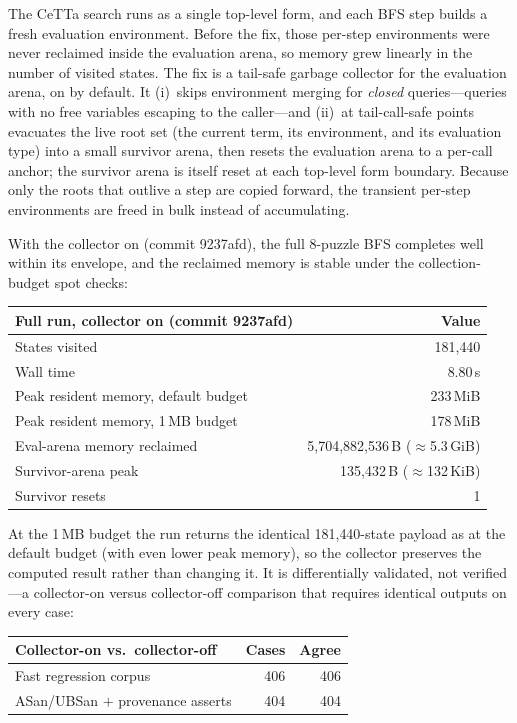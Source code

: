 \documentclass[11pt]{article}
\newcommand{\CeTTa}{\textup{CeTTa}}
\begin{document}
The \CeTTa{} search runs as a single top-level form, and each BFS step
builds a fresh evaluation environment.  Before the fix, those per-step
environments were never reclaimed inside the evaluation arena, so memory
grew linearly in the number of visited states.  The fix is a tail-safe
garbage collector for the evaluation arena, on by default.  It
(i)~skips environment merging for \emph{closed} queries---queries with
no free variables escaping to the caller---and (ii)~at tail-call-safe
points evacuates the live root set (the current term, its environment,
and its evaluation type) into a small survivor arena, then resets the
evaluation arena to a per-call anchor; the survivor arena is itself
reset at each top-level form boundary.  Because only the roots that
outlive a step are copied forward, the transient per-step environments
are freed in bulk instead of accumulating.

With the collector on (commit 9237afd), the full 8-puzzle BFS completes
well within its envelope, and the reclaimed memory is stable under the
collection-budget spot checks:

\begin{center}
\begin{tabular}{lr}
\toprule
Full run, collector on (commit 9237afd) & Value \\
\midrule
States visited & 181{,}440 \\
Wall time & 8.80\,s \\
Peak resident memory, default budget & 233\,MiB \\
Peak resident memory, 1\,MB budget & 178\,MiB \\
Eval-arena memory reclaimed & 5{,}704{,}882{,}536\,B ($\approx$5.3\,GiB) \\
Survivor-arena peak & 135{,}432\,B ($\approx$132\,KiB) \\
Survivor resets & 1 \\
\bottomrule
\end{tabular}
\end{center}

At the 1\,MB budget the run returns the identical 181{,}440-state
payload as at the default budget (with even lower peak memory), so the
collector preserves the computed result rather than changing it.  It is
differentially validated, not verified---a collector-on versus
collector-off comparison that requires identical outputs on every case:

\begin{center}
\begin{tabular}{lrr}
\toprule
Collector-on vs.\ collector-off & Cases & Agree \\
\midrule
Fast regression corpus & 406 & 406 \\
ASan/UBSan $+$ provenance asserts & 404 & 404 \\
\bottomrule
\end{tabular}
\end{center}
\end{document}
